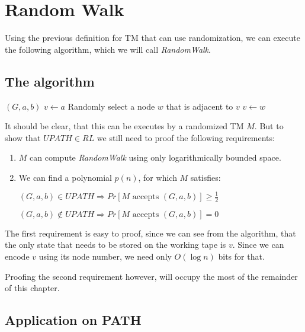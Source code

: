 \chapter{Random Walk}\label{random-walk}

Using the previous definition for TM that can use randomization, we can
execute the following algorithm, which we will call \emph{RandomWalk}.

\section{The algorithm}\label{the-algorithm}

\renewcommand{\algorithmicrequire}{\textbf{Input:}}
\renewcommand{\algorithmicensure}{\textbf{Output:}}

\begin{algorithmic}
\Require $(G, a, b)$
\State $v \gets a$
    \State Randomly select a node $w$ that is adjacent to $v$
    \State $v \gets w$
    \EndIf
\EndFor
{}
\end{algorithmic}

It should be clear, that this can be executes by a randomized TM $M$.
But to show that $UPATH \in RL$ we still need to proof the following
requirements:

\begin{enumerate}
\def\labelenumi{\arabic{enumi}.}
\item
  $M$ can compute \emph{RandomWalk} using only logarithmically bounded
  space.
\item
  We can find a polynomial $p(n)$, for which $M$ satisfies:

  $(G, a, b) \in UPATH \Rightarrow Pr[M \text{ accepts } (G, a, b)] \geq \frac{1}{2}$

  $(G, a, b) \not \in UPATH \Rightarrow Pr[M \text{ accepts } (G, a, b)] = 0$
\end{enumerate}

The first requirement is easy to proof, since we can see from the
algorithm, that the only state that needs to be stored on the working
tape is $v$. Since we can encode $v$ using its node number, we need only
$O(\log n)$ bits for that.

Proofing the second requirement however, will occupy the most of the
remainder of this chapter.

\section{Application on PATH}\label{application-on-path}

